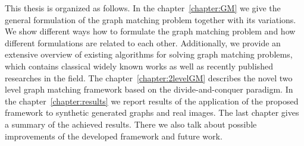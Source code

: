 This thesis is organized as follows. In the chapter~\ref{chapter:GM} we give the general formulation of the graph matching problem together with its variations. We show different ways how to formulate the graph matching problem and how different formulations are related to each other. Additionally, we provide an extensive overview of existing algorithms for solving graph matching problems, which contains classical widely known works as well as recently published researches in the field.
The chapter~\ref{chapter:2levelGM} describes the novel two level graph matching framework based on the divide-and-conquer paradigm. %
In the chapter~\ref{chapter:results} we report results of the application of the proposed framework to synthetic generated graphs and real images. The last chapter gives a summary of the achieved results. There we also talk about possible improvements of the developed framework and future work.

